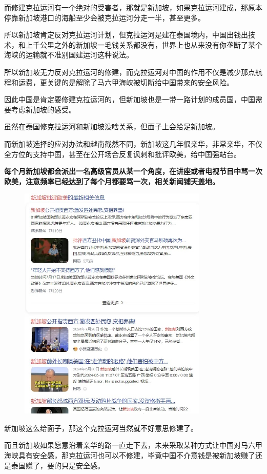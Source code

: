 \documentclass[UTF8, 11pt, oneside]{ctexart}
\newcommand{\zd}[1]{\textbf{\textcolor[RGB]{123,12,0}{#1}}} %
\begin{document}
而修建克拉运河有一个绝对的受害者，那就是新加坡，如果克拉运河建成，那原本停靠新加坡港口的海船至少会被克拉运河分走一半，甚至更多。

所以新加坡肯定反对克拉运河计划，但克拉运河是建在泰国境内，中国出钱出技术，和上千公里之外的新加坡一毛钱关系都没有，世界上也从来没有你垄断了某个海峡的运输就不准别国建运河这种说法。

所以新加坡无力反对克拉运河的修建，而克拉运河对中国的作用不仅是减少那点航程和运费，更关键的是解除了马六甲海峡被切断给中国带来的安全风险。

因此中国是肯定要修建克拉运河的，但新加坡也是一带一路计划的成员国，中国需要考虑新加坡的感受。

虽然在泰国修克拉运河和新加坡没啥关系，但面子上会给足新加坡。

而新加坡选择的应对办法和越南截然不同，新加坡这几年很亲华，非常亲华，不仅全方位的支持中国，甚至在公开场合反复讽刺和批评欧美，给中国强站台。

\zd{每个月新加坡都会派出一名高级官员从某一个角度，在讲座或者电视节目中骂一次欧美，注意频率已经达到了每个月都要骂一次，相关新闻铺天盖地。}

\begin{figure}[H]
    \centering
    \includegraphics[width=9cm]{2024-08-17-009.jpg}
\end{figure}

新加坡这么给面子，那这个克拉运河当然就不好意思修建了。

而且新加坡如果愿意沿着亲华的路一直走下去，未来采取某种方式让中国对马六甲海峡具有安全感，那克拉运河也可以不修建，毕竟中国不介意钱是被新加坡赚了还是泰国赚了，要的只是安全感。
\end{document}
